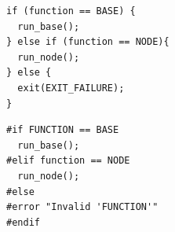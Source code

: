 \begin{minipage}[b]{0.5\linewidth}
  \vspace{+10pt}
  \begin{center}
    \begin{lstlisting}
if (function == BASE) {
  run_base();
} else if (function == NODE){
  run_node();
} else {
  exit(EXIT_FAILURE);
}
    \end{lstlisting}
  \end{center}
\end{minipage}
\hspace{0.1cm}
\begin{minipage}[b]{0.5\linewidth}
  \vspace{+10pt}
  \begin{center}
    \begin{lstlisting}
#if FUNCTION == BASE
  run_base();
#elif function == NODE
  run_node();
#else
#error "Invalid 'FUNCTION'"
#endif
    \end{lstlisting}
  \end{center}
\end{minipage}

